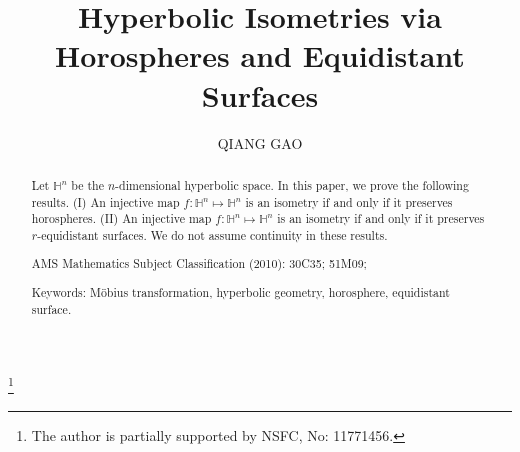 \documentclass[12pt,reqno,oneside]{amsart}
\theoremstyle{plain}
\theoremstyle{definition}
\theoremstyle{remark}
\numberwithin{equation}{section}
\renewcommand{\H}{{\mathbb{H}^n}}
\begin{document}
\title[Characterizations of Hyperbolic Isometries]{Hyperbolic Isometries via Horospheres and Equidistant Surfaces}
\author{QIANG GAO}

\address{Department of Mathematics, Sun Yat-Sen University, 510275, Guangzhou, P. R. China}
\thanks{The	author is partially supported by NSFC, No: 11771456.  }


\begin{abstract}
	Let $\H$ be the $n$-dimensional hyperbolic space.  In this paper, we prove the
	following results. (I) An injective map $f: \H\mapsto \H$ is an isometry if and
	only if it preserves horospheres.  (II) An injective map $f:\H\mapsto\H$ is an
	isometry if and only if it preserves $r$-equidistant surfaces. We do not
	assume continuity in these results.

\bigskip
\noindent AMS Mathematics Subject Classification (2010): 30C35; 51M09;

\medskip

\noindent Keywords: M\"{o}bius transformation, hyperbolic geometry, horosphere,
equidistant surface.
\end{abstract}


\maketitle
\end{document}
